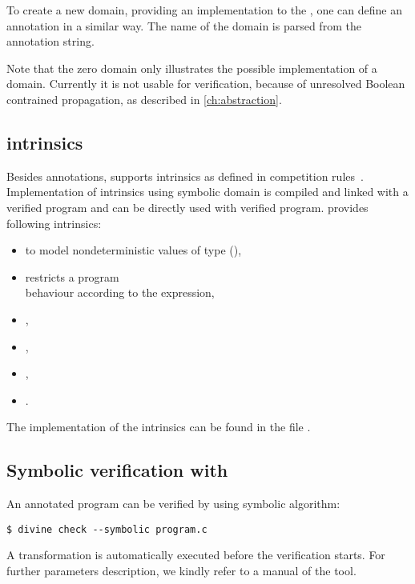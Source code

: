 To create a new domain, providing an implementation to the \LART, one can define
an annotation in a similar way. The name of the domain is parsed from the
annotation string.

Note that the zero domain only illustrates the possible
implementation of a domain. Currently it is not usable for verification, because
of unresolved Boolean contrained propagation, as described in
\autoref{ch:abstraction}.

\subsection{\svcomp intrinsics}
Besides annotations, \DIVINE supports \svcomp intrinsics as defined in
competition rules~\cite{svcomp}. Implementation of intrinsics using symbolic
domain is compiled and linked with a verified program and can be directly used
with verified program. \DIVINE provides following intrinsics:
\begin{itemize}
\item {} to model nondeterministic values of
    type  (),
\item {} restricts a program \\behaviour
    according to the expression,
\item {},
\item {},
\item {},
\item {}.
\end{itemize}
The implementation of the intrinsics can be found in the file .

\subsection{Symbolic verification with \DIVINE}

An annotated program can be verified by \DIVINE using symbolic algorithm:
\begin{verbatim}
$ divine check --symbolic program.c
\end{verbatim}
A transformation is automatically executed before the verification starts. For
further parameters description, we kindly refer to a manual of the tool.

